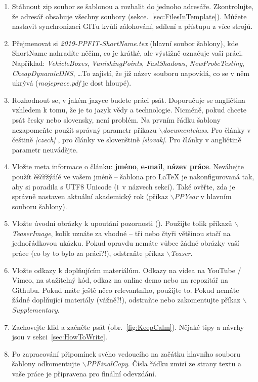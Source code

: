 \begin{enumerate}
	\item Stáhnout zip soubor se šablonou a rozbalit do jednoho adresáře. Zkontrolujte, že adresář obsahuje všechny soubory (sekce.~\ref{sec:FilesInTemplate}). Můžete nastavit synchronizaci GITu kvůli zálohování, sdílení a přístupu z více strojů.
	\item Přejmenovat si \textit{2019-PPFIT-ShortName.tex} (hlavní soubor šablony), kde ShortName nahradíte něčím, co je krátké, ale výstižně označuje vaši práci. Například: \textit{VehicleBoxes}, \textit{VanishingPoints}, \textit{FastShadows}, \textit{NewProbeTesting}, \textit{CheapDynamicDNS}, \ldots  To zajistí, že již název souboru napovídá, co se v něm ukrývá (\textit{mojeprace.pdf} je dost hloupé).
	\item Rozhodnout se, v jakém jazyce budete práci psát. Doporučuje se angličtina vzhledem k tomu, že je to jazyk vědy a technologie. Nicméně, pokud chcete psát česky nebo slovensky, není problém. Na prvním řádku šablony nezapomeňte použít správný parametr příkazu \textit{$\backslash$documentclass}. Pro články v češtině \textit{[czech]} , pro články ve slovenštině \textit{[slovak]}. Pro články v angličtině parametr neuvádějte.
	\item Vložte meta informace o článku: \textbf{jméno}, \textbf{e-mail}, \textbf{název práce}. Neváhejte použít ěščřžýáíé ve vašem jméně -- šablona pro \LaTeX{} je nakonfigurovaná tak, aby si poradila s UTF8 Unicode (i~v názvech sekcí). Také ověřte, zda je správně nastaven aktuální akademický rok (příkaz \textit{$\backslash$PPYear} v hlavním souboru šablony).
	\item Vložte úvodní obrázky k upoutání pozornosti ().  Použijte tolik příkazů \textit{$\backslash$TeaserImage}, kolik uznáte za vhodné --  tři nebo čtyři většinou stačí na jednořádkovou ukázku. Pokud opravdu nemáte vůbec žádné obrázky vaší práce (co by to bylo za práci?!), odstraňte příkaz \textit{$\backslash$Teaser}.
	\item Vložte odkazy k doplňujícím materiálům. Odkazy na videa na YouTube / Vimeo, na stažitelný kód, odkaz na online demo nebo na repozitář na Githubu. Pokud máte ještě něco relevantního, použijte to. Pokud nemáte žádné doplňující materiály (vážně?!), odstraňte nebo zakomentujte příkaz \textit{$\backslash$Supplementary}.
	\item Zachovejte klid a začněte psát (obr.~\ref{fig:KeepCalm}). Nějaké tipy a návrhy jsou v sekci~\ref{sec:HowToWrite}.
	\item Po zapracování připomínek svého vedoucího na začátku hlavního souboru šablony  odkomentujte \textit{$\backslash$PPFinalCopy}. Čísla řádku zmizí ze strany textu a vaše práce je připravena pro finální odevzdání. 
\end{enumerate}

